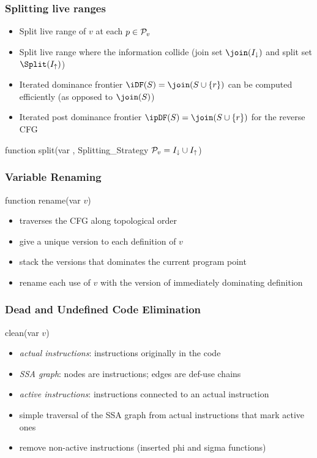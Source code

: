 \begin{frame}
\frametitle{Splitting live ranges}
\begin{itemize}
\item Split live range of $v$ at each $p\in {\cal P}_v$
\item Split live range where the information collide (join set $\join(I_\downarrow)$ and split set $\Split(I_\uparrow)$)
\item Iterated dominance frontier $\iDF(S)=\join(S\cup \{r\})$ can be computed efficiently (as opposed to $\join(S)$)
\item Iterated post dominance frontier $\ipDF(S)=\join(S\cup \{r\})$ for the reverse CFG
\end{itemize}
\begin{block}{\textsf{function split}(var , Splitting\_Strategy
${\cal P}_v = I_\downarrow \cup I_\uparrow$)}
\end{block}
\end{frame}

\begin{frame}
\frametitle{Variable Renaming}
\begin{block}{\sf function rename(var $v$)}
\begin{itemize}
\item traverses the CFG along topological order
\item give a unique version to each definition of $v$
\item stack the versions that dominates the current program point
\item rename each use of $v$ with the version of immediately dominating definition 
\end{itemize}
\end{block}
\end{frame}

\begin{frame}
\frametitle{Dead and Undefined Code Elimination}
\begin{block}{\textsf{clean}(var $v$)}
\begin{itemize}
\item \emph{actual instructions}: instructions originally in the code
\item \emph{SSA graph}: nodes are instructions; edges are def-use chains
\item \emph{active instructions}: instructions connected to an actual instruction
\item simple traversal of the SSA graph from actual instructions that mark active ones
\item remove non-active instructions (inserted phi and sigma functions) 
\end{itemize}
\end{block}
\end{frame}

